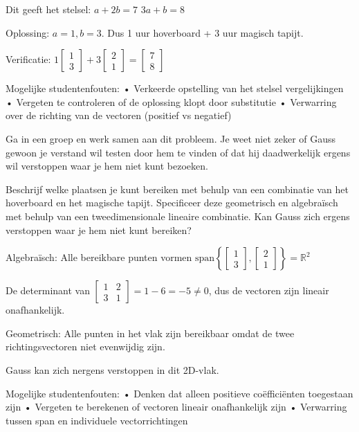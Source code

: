 \documentclass{ximera}
\begin{document}
\begin{problem}
\begin{freeResponse}
Dit geeft het stelsel:
$a + 2b = 7$
$3a + b = 8$

Oplossing: $a = 1, b = 3$. Dus 1 uur hoverboard + 3 uur magisch tapijt.

Verificatie: $1\begin{bmatrix} 1 \\ 3 \end{bmatrix} + 3\begin{bmatrix} 2 \\ 1 \end{bmatrix} = \begin{bmatrix} 7 \\ 8 \end{bmatrix}$

Mogelijke studentenfouten:
• Verkeerde opstelling van het stelsel vergelijkingen
• Vergeten te controleren of de oplossing klopt door substitutie
• Verwarring over de richting van de vectoren (positief vs negatief)
\end{freeResponse}
\end{problem}

\begin{problem}
Ga in een groep en werk samen aan dit probleem. Je weet niet zeker of Gauss gewoon je verstand wil testen door hem te vinden of dat hij daadwerkelijk ergens wil verstoppen waar je hem niet kunt bezoeken.

Beschrijf welke plaatsen je kunt bereiken met behulp van een combinatie van het hoverboard en het magische tapijt. Specificeer deze geometrisch en algebraïsch met behulp van een tweedimensionale lineaire combinatie. Kan Gauss zich ergens verstoppen waar je hem niet kunt bereiken?

\begin{freeResponse}
Algebraïsch: Alle bereikbare punten vormen $\text{span}\left\{\begin{bmatrix} 1 \\ 3 \end{bmatrix}, \begin{bmatrix} 2 \\ 1 \end{bmatrix}\right\} = \mathbb{R}^2$

De determinant van $\begin{bmatrix} 1 & 2 \\ 3 & 1 \end{bmatrix} = 1-6 = -5 \neq 0$, dus de vectoren zijn lineair onafhankelijk.

Geometrisch: Alle punten in het vlak zijn bereikbaar omdat de twee richtingsvectoren niet evenwijdig zijn.

Gauss kan zich nergens verstoppen in dit 2D-vlak.

Mogelijke studentenfouten:
• Denken dat alleen positieve coëfficiënten toegestaan zijn
• Vergeten te berekenen of vectoren lineair onafhankelijk zijn
• Verwarring tussen span en individuele vectorrichtingen
\end{freeResponse}
\end{problem}
\end{document}
